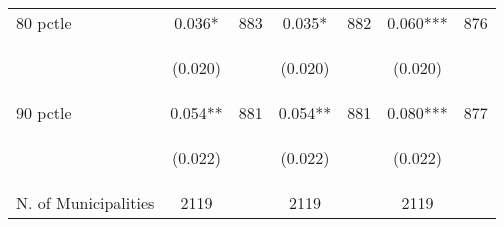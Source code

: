 \begin{tabular}{lcccccc}
80 pctle   &  0.036*   &  883  &   0.035*  &  882 &  0.060***  &  876   \\

\vspace{4pt} &  \begin{footnotesize}(0.020)\end{footnotesize}   & &
			    \begin{footnotesize}(0.020)\end{footnotesize}   & &
			    \begin{footnotesize}(0.020)\end{footnotesize}   &
			     \\          

90 pctle   &  0.054**   &  881  &   0.054**  &  881 &  0.080***  &  877   \\

\vspace{4pt} &  \begin{footnotesize}(0.022)\end{footnotesize}   & &
			    \begin{footnotesize}(0.022)\end{footnotesize}   & &
			    \begin{footnotesize}(0.022)\end{footnotesize}   &
			     \\          


N. of Municipalities   &   2119   & &    2119 &    &  2119  &   \\
\hline	


\end{tabular}%
